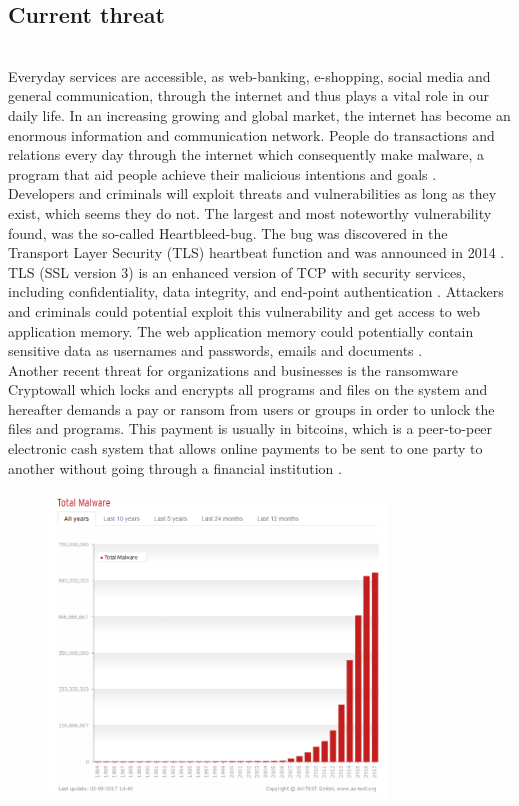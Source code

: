 \documentclass[12pt]{article} %
\begin{document}
\subsection{Current threat}
\\ 
Everyday services are accessible, as web-banking, e-shopping, social media and general communication, through the internet and thus plays a vital role in our daily life. In an increasing growing and global market, the internet has become an enormous information and communication network. People do transactions and relations every day through the internet which consequently make malware, a program that aid people achieve their malicious intentions and goals \cite{kosmidis2017machine}. \\
Developers and criminals will exploit threats and vulnerabilities as long as they exist, which seems they do not. The largest and most noteworthy vulnerability found, was the so-called Heartbleed-bug. The bug was discovered in the Transport Layer Security (TLS) heartbeat function and was announced in 2014 \cite{kosmidis2017machine}. TLS (SSL version 3) is an enhanced version of TCP with security services, including confidentiality, data integrity, and end-point authentication \cite{kurose2010computer}. Attackers and criminals could potential exploit this vulnerability and get access to web application memory. The web application memory could potentially contain sensitive data as usernames and passwords, emails and documents \cite{kosmidis2017machine}. \\
Another recent threat for organizations and businesses is the ransomware Cryptowall which locks and encrypts all programs and files on the system and hereafter demands a pay or ransom from users or groups in order to unlock the files and programs. This payment is usually in bitcoins, which is a peer-to-peer electronic cash system that allows online payments to be sent to one party to another without going through a financial institution \cite{kosmidis2017machine} \cite{nakamoto2008bitcoin}. \\
\begin{figure}[H]
    \centering
    \includegraphics[width=0.8\textwidth]{totalmalware}
    \captionsetup{width=0.8\textwidth}
    \caption{}
    \label{fig:totalmalware}
\end{figure}
\end{document}
